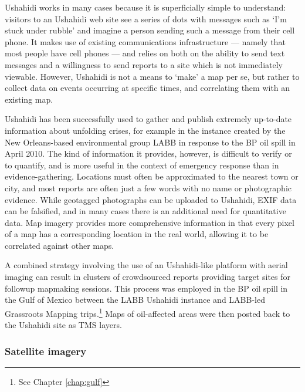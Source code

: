 \documentclass[11pt,oneside,notitlepage]{report}
\begin{document}
{{%

Ushahidi works in many cases because it is superficially simple to understand: visitors to an Ushahidi web site see a series of dots with messages such as `I'm stuck under rubble' and imagine a person sending such a message from their cell phone. It makes use of existing communications infrastructure --- namely that most people have cell phones --- and relies on both on the ability to send text messages and a willingness to send reports to a site which is not immediately viewable. However, Ushahidi is not a means to `make' a map per se, but rather to collect data on events occurring at specific times, and correlating them with an existing map.

Ushahidi has been successfully used to gather and publish extremely up-to-date information about unfolding crises, for example in the instance created by the New Orleans-based environmental group \ac{LABB} in response to the BP oil spill in April 2010. The kind of information it provides, however, is difficult to verify or to quantify, and is more useful in the context of emergency response than in evidence-gathering. \cite{meier2010verification} Locations must often be approximated to the nearest town or city, and most reports are often just a few words with no name or photographic evidence. While geotagged photographs can be uploaded to Ushahidi, EXIF data can be falsified, and in many cases there is an additional need for quantitative data. Map imagery provides more comprehensive information in that every pixel of a map has a corresponding location in the real world, allowing it to be correlated against other maps. 

A combined strategy involving the use of an Ushahidi-like platform with aerial imaging can result in clusters of crowdsourced reports providing target sites for followup mapmaking sessions. This process was employed in the BP oil spill in the Gulf of Mexico between the \ac{LABB} Ushahidi instance and \ac{LABB}-led Grassroots Mapping trips.\footnote{See Chapter \ref{chap:gulf}} Maps of oil-affected areas were then posted back to the Ushahidi site as \ac{TMS} layers.


\subsubsection{Satellite imagery}
\label{subsec:satelliterelease}

}}
\end{document}
